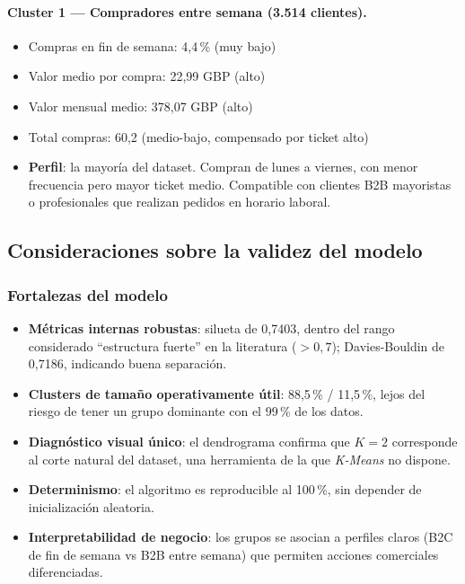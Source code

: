 \documentclass[11pt,a4paper]{article}
\begin{document}
\paragraph{Cluster 1 — Compradores entre semana (3.514 clientes).}
\begin{itemize}
    \item Compras en fin de semana: 4,4\,\% (muy bajo)
    \item Valor medio por compra: 22,99 GBP (alto)
    \item Valor mensual medio: 378,07 GBP (alto)
    \item Total compras: 60,2 (medio-bajo, compensado por ticket alto)
    \item \textbf{Perfil}: la mayoría del dataset. Compran de lunes a viernes, con menor frecuencia pero mayor ticket medio. Compatible con clientes B2B mayoristas o profesionales que realizan pedidos en horario laboral.
\end{itemize}

\subsection{Consideraciones sobre la validez del modelo}

\subsubsection{Fortalezas del modelo}

\begin{itemize}
    \item \textbf{Métricas internas robustas}: silueta de 0,7403, dentro del rango considerado ``estructura fuerte'' en la literatura ($> 0,7$); Davies-Bouldin de 0,7186, indicando buena separación.
    \item \textbf{Clusters de tamaño operativamente útil}: 88,5\,\% / 11,5\,\%, lejos del riesgo de tener un grupo dominante con el 99\,\% de los datos.
    \item \textbf{Diagnóstico visual único}: el dendrograma confirma que $K=2$ corresponde al corte natural del dataset, una herramienta de la que \textit{K-Means} no dispone.
    \item \textbf{Determinismo}: el algoritmo es reproducible al 100\,\%, sin depender de inicialización aleatoria.
    \item \textbf{Interpretabilidad de negocio}: los grupos se asocian a perfiles claros (B2C de fin de semana vs B2B entre semana) que permiten acciones comerciales diferenciadas.
\end{itemize}
\end{document}
